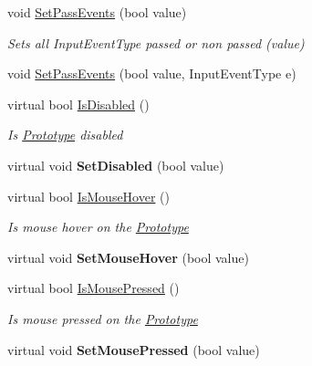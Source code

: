 \begin{DoxyCompactItemize}
void \mbox{\hyperlink{class_space_v_i_l_1_1_prototype_ac2a3bb6f4b5c26dba5375eabf774de74}{Set\+Pass\+Events}} (bool value)
\begin{DoxyCompactList}\small\item\em Sets all Input\+Event\+Type passed or non passed (value) \end{DoxyCompactList}\item 
void \mbox{\hyperlink{class_space_v_i_l_1_1_prototype_a412b7eb2ed5ee06834127b06aa04a1fd}{Set\+Pass\+Events}} (bool value, Input\+Event\+Type e)
\item 
virtual bool \mbox{\hyperlink{class_space_v_i_l_1_1_prototype_acfe05e01f98da47801861ce5cc03640a}{Is\+Disabled}} ()
\begin{DoxyCompactList}\small\item\em Is \mbox{\hyperlink{class_space_v_i_l_1_1_prototype}{Prototype}} disabled \end{DoxyCompactList}\item 
\mbox{\label{class_space_v_i_l_1_1_prototype_ac0aa16bd73553f26bcb8bd7124684e4c}} 
virtual void {\bfseries Set\+Disabled} (bool value)
\item 
virtual bool \mbox{\hyperlink{class_space_v_i_l_1_1_prototype_a6b8dcf54d97cc24aa7ef347bd33f8664}{Is\+Mouse\+Hover}} ()
\begin{DoxyCompactList}\small\item\em Is mouse hover on the \mbox{\hyperlink{class_space_v_i_l_1_1_prototype}{Prototype}} \end{DoxyCompactList}\item 
\mbox{\label{class_space_v_i_l_1_1_prototype_a02c7d02f9e07f43769ce48d0263b04ea}} 
virtual void {\bfseries Set\+Mouse\+Hover} (bool value)
\item 
virtual bool \mbox{\hyperlink{class_space_v_i_l_1_1_prototype_a0cf4369361d82f9398292f3d727388ab}{Is\+Mouse\+Pressed}} ()
\begin{DoxyCompactList}\small\item\em Is mouse pressed on the \mbox{\hyperlink{class_space_v_i_l_1_1_prototype}{Prototype}} \end{DoxyCompactList}\item 
\mbox{\label{class_space_v_i_l_1_1_prototype_acef7830db4bf07583eea2f6057258d6d}} 
virtual void {\bfseries Set\+Mouse\+Pressed} (bool value)

\end{DoxyCompactItemize}
